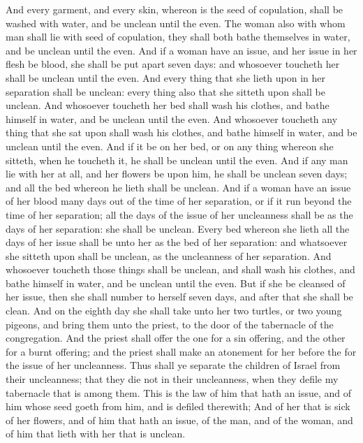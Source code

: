 \begin{biblechapter}
\verse And every garment, and every skin, whereon is the seed of copulation, shall be washed with water, and be unclean until the even.
\verse The woman also with whom man shall lie with seed of copulation, they shall both bathe themselves in water, and be unclean until the even.
\verse And if a woman have an issue, and her issue in her flesh be blood, she shall be put apart seven days: and whosoever toucheth her shall be unclean until the even.
\verse And every thing that she lieth upon in her separation shall be unclean: every thing also that she sitteth upon shall be unclean.
\verse And whosoever toucheth her bed shall wash his clothes, and bathe himself in water, and be unclean until the even.
\verse And whosoever toucheth any thing that she sat upon shall wash his clothes, and bathe himself in water, and be unclean until the even.
\verse And if it be on her bed, or on any thing whereon she sitteth, when he toucheth it, he shall be unclean until the even.
\verse And if any man lie with her at all, and her flowers be upon him, he shall be unclean seven days; and all the bed whereon he lieth shall be unclean.
\verse And if a woman have an issue of her blood many days out of the time of her separation, or if it run beyond the time of her separation; all the days of the issue of her uncleanness shall be as the days of her separation: she shall be unclean.
\verse Every bed whereon she lieth all the days of her issue shall be unto her as the bed of her separation: and whatsoever she sitteth upon shall be unclean, as the uncleanness of her separation.
\verse And whosoever toucheth those things shall be unclean, and shall wash his clothes, and bathe himself in water, and be unclean until the even.
\verse But if she be cleansed of her issue, then she shall number to herself seven days, and after that she shall be clean.
\verse And on the eighth day she shall take unto her two turtles, or two young pigeons, and bring them unto the priest, to the door of the tabernacle of the congregation.
\verse And the priest shall offer the one for a sin offering, and the other for a burnt offering; and the priest shall make an atonement for her before the \LORD for the issue of her uncleanness.
\verse Thus shall ye separate the children of Israel from their uncleanness; that they die not in their uncleanness, when they defile my tabernacle that is among them.
\verse This is the law of him that hath an issue, and of him whose seed goeth from him, and is defiled therewith;
\verse And of her that is sick of her flowers, and of him that hath an issue, of the man, and of the woman, and of him that lieth with her that is unclean.
\end{biblechapter}

